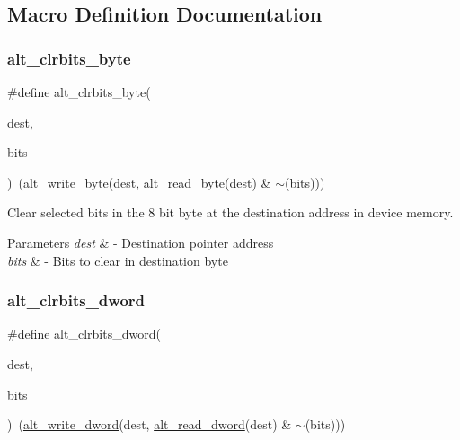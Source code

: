 \subsection{Macro Definition Documentation}
\mbox{\label{group__ALT__SOCAL__UTIL__SC__FUNC_gab264eb8a3ca252746a67c2f8082e99f0}} 
\subsubsection{\texorpdfstring{alt\_clrbits\_byte}{alt\_clrbits\_byte}}
{\footnotesize\ttfamily \#define alt\+\_\+clrbits\+\_\+byte(\begin{DoxyParamCaption}\item[{}]{dest,  }\item[{}]{bits }\end{DoxyParamCaption})~(\mbox{\hyperlink{group__ALT__SOCAL__UTIL__RW__FUNC_ga48f504d9c370e45073a9c5e142e1036d}{alt\+\_\+write\+\_\+byte}}(dest, \mbox{\hyperlink{group__ALT__SOCAL__UTIL__RW__FUNC_ga1bf0798969c891f5885170ff2de3ac88}{alt\+\_\+read\+\_\+byte}}(dest) \& $\sim$(bits)))}

Clear selected bits in the 8 bit byte at the destination address in device memory. 
\begin{DoxyParams}{Parameters}
{\em dest} & -\/ Destination pointer address \\
\hline
{\em bits} & -\/ Bits to clear in destination byte \\
\hline
\end{DoxyParams}
\mbox{\label{group__ALT__SOCAL__UTIL__SC__FUNC_ga77f1adf2ec7cf806a77a76dcaf35d7de}} 
\subsubsection{\texorpdfstring{alt\_clrbits\_dword}{alt\_clrbits\_dword}}
{\footnotesize\ttfamily \#define alt\+\_\+clrbits\+\_\+dword(\begin{DoxyParamCaption}\item[{}]{dest,  }\item[{}]{bits }\end{DoxyParamCaption})~(\mbox{\hyperlink{group__ALT__SOCAL__UTIL__RW__FUNC_ga0fe80f8e5b6f3f09976dd35df49285e7}{alt\+\_\+write\+\_\+dword}}(dest, \mbox{\hyperlink{group__ALT__SOCAL__UTIL__RW__FUNC_gad66f5bf6cf73c5ba348a7ab118bcd2a0}{alt\+\_\+read\+\_\+dword}}(dest) \& $\sim$(bits)))}

